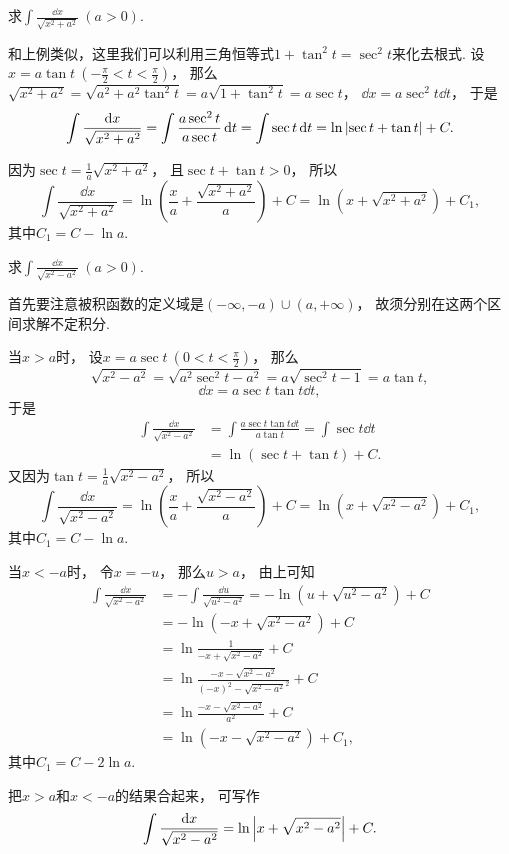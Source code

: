 \begin{example}
求\(\int \frac{\dd{x}}{\sqrt{x^2 + a^2}}\ (a>0)\).
\begin{solution}
和上例类似，这里我们可以利用三角恒等式\(1+\tan^2t=\sec^2t\)来化去根式.
设\(x = a \tan t\ (-\frac{\pi}{2} < t < \frac{\pi}{2})\)，
那么\(\sqrt{x^2 + a^2}
= \sqrt{a^2 + a^2 \tan^2 t}
= a \sqrt{1 + \tan^2 t}
= a \sec t\)，
\(\dd{x} = a \sec^2 t \dd{t}\)，
于是\[
	\int \frac{\dd{x}}{\sqrt{x^2 + a^2}}
	= \int \frac{a \sec^2 t}{a \sec t} \dd{t}
	= \int \sec t \dd{t}
	= \ln\abs{\sec t + \tan t} + C.
\]

因为\(\sec t = \frac{1}{a} \sqrt{x^2 + a^2}\)，
且\(\sec t + \tan t > 0\)，
所以\[
	\int \frac{\dd{x}}{\sqrt{x^2 + a^2}}
	= \ln( \frac{x}{a} + \frac{\sqrt{x^2 + a^2}}{a} ) + C
	= \ln(x + \sqrt{x^2 + a^2}) + C_1,
\]
其中\(C_1 = C - \ln a\).
\end{solution}
\end{example}

\begin{example}
求\(\int \frac{\dd{x}}{\sqrt{x^2 - a^2}}\ (a>0)\).
\begin{solution}
首先要注意被积函数的定义域是\((-\infty,-a)\cup(a,+\infty)\)，
故须分别在这两个区间求解不定积分.

当\(x > a\)时，
设\(x = a \sec t\ (0 < t < \frac{\pi}{2})\)，
那么\[
	\sqrt{x^2 - a^2} = \sqrt{a^2 \sec^2 t - a^2} = a \sqrt{\sec^2 t - 1} = a \tan t,
\]\[
	\dd{x} = a \sec t \tan t \dd{t},
\]
于是\begin{align*}
	\int \frac{\dd{x}}{\sqrt{x^2 - a^2}}
	&= \int \frac{a \sec t \tan t \dd{t}}{a \tan t}
	= \int \sec t \dd{t} \\
	&= \ln(\sec t + \tan t) + C.
\end{align*}
又因为\(\tan t = \frac{1}{a} \sqrt{x^2 - a^2}\)，
所以\[
	\int \frac{\dd{x}}{\sqrt{x^2 - a^2}}
	= \ln( \frac{x}{a} + \frac{\sqrt{x^2 - a^2}}{a} ) + C
	= \ln( x + \sqrt{x^2 - a^2} ) + C_1,
\]
其中\(C_1 = C - \ln a\).

当\(x < -a\)时，
令\(x = -u\)，
那么\(u > a\)，
由上可知\begin{align*}
	\int \frac{\dd{x}}{\sqrt{x^2 - a^2}}
	&= -\int \frac{\dd{u}}{\sqrt{u^2 - a^2}}
	= -\ln(u + \sqrt{u^2 - a^2}) + C \\
	&= -\ln(-x + \sqrt{x^2 - a^2}) + C \\
	&= \ln\frac{1}{-x + \sqrt{x^2 - a^2}} + C \\
	&= \ln\frac{-x - \sqrt{x^2 - a^2}}{(-x)^2 - \sqrt{x^2 - a^2}^2} + C \\
	&= \ln\frac{-x - \sqrt{x^2 - a^2}}{a^2} + C \\
	&= \ln(-x - \sqrt{x^2 - a^2}) + C_1,
\end{align*}
其中\(C_1 = C - 2 \ln a\).

把\(x > a\)和\(x < -a\)的结果合起来，
可写作\[
	\int \frac{\dd{x}}{\sqrt{x^2 - a^2}}
	= \ln\abs{x + \sqrt{x^2 - a^2}} + C.
\]
\end{solution}
\end{example}

